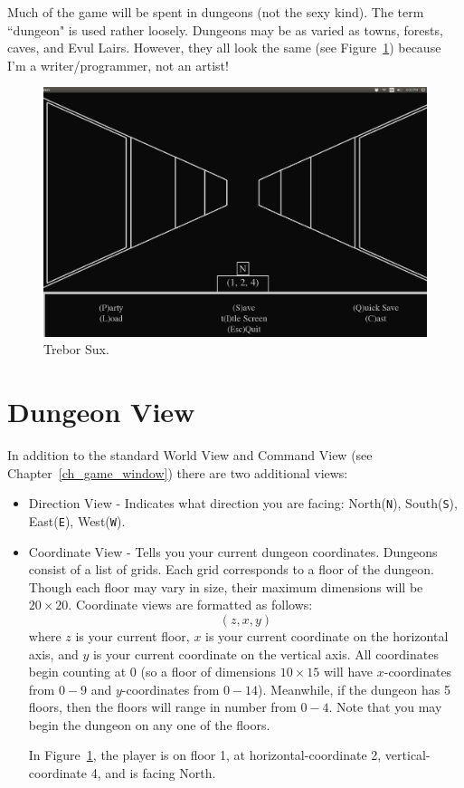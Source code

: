 \documentclass{report}
\begin{document}
    Much of the game will be spent in dungeons (not the sexy kind). The term ``dungeon" is used rather loosely. Dungeons may be as varied as towns, forests,
    caves, and Evul Lairs. However, they all look the same (see Figure~\ref{fig_dungeon}) because I'm a writer/programmer, not an artist!
    \begin{figure}[h!]
        \includegraphics[width=\textwidth]{dungeon}
        \caption{Trebor Sux.}
        \label{fig_dungeon}
    \end{figure}

\section{Dungeon View}
In addition to the standard World View and Command View (see 
Chapter~\ref{ch_game_window}) there are two additional views:
\begin{itemize}
    \item Direction View - Indicates what direction you are facing: 
    North(\verb|N|), South(\verb|S|), East(\verb|E|), West(\verb|W|).
    \item Coordinate View - Tells you your current dungeon coordinates. Dungeons
    consist of a list of grids. Each grid corresponds to a floor of the dungeon. 
    Though each floor may vary in size, their maximum dimensions will be 
    $20\times 20$.
    Coordinate views are formatted as follows:
    $$(z,x,y)$$
    where $z$ is your current floor, $x$ is your current coordinate on the 
    horizontal axis, and $y$ is your current coordinate on the vertical axis. 
    All coordinates begin counting at $0$ (so a floor of dimensions
    $10\times 15$ will have $x$-coordinates from $0-9$ and $y$-coordinates from
    $0-14$). Meanwhile,
    if the dungeon has 5 floors, then the floors will range in number from
    $0-4$. Note that you may begin the dungeon on any one of the floors.

    In Figure~\ref{fig_dungeon}, the player is on floor 1, at horizontal-coordinate
    2, vertical-coordinate 4, and is facing North.
\end{itemize}
\end{document}
